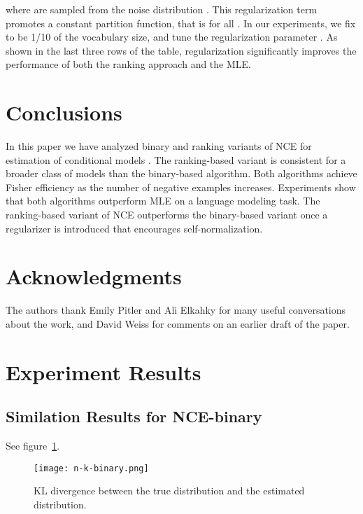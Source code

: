 \documentclass[11pt,a4paper]{article}
\begin{document}
where  are sampled from the noise distribution . This regularization term promotes a constant partition
function, that is  for all .
In our experiments, we fix  to be 1/10 of the vocabulary size,  and tune the regularization parameter .  As shown in the last three rows of the table,
regularization significantly improves the performance of both the ranking
approach and the MLE. 
 


\section{Conclusions}
In this paper we have analyzed binary and ranking variants of NCE for estimation of conditional models . The ranking-based variant is consistent for a broader class of models than the binary-based algorithm. Both algorithms achieve Fisher efficiency as the number of negative examples increases. 
Experiments show that both algorithms outperform MLE on a language modeling task.  
The ranking-based variant of NCE outperforms the binary-based variant once a regularizer is introduced that encourages self-normalization.



\section*{Acknowledgments}

The authors thank Emily Pitler and Ali Elkahky for many useful conversations about the work, 
and David Weiss for comments on an earlier draft of the paper.













 \clearpage{}\appendix
\section{Experiment Results}
\subsection{Similation Results for NCE-binary}
\label{sec:sim-binary}
See figure~\ref{fig:sim-binary}.
\begin{figure}[h]
\texttt{[image: n-k-binary.png]}
\caption{KL divergence between the true distribution and the estimated distribution.}
\label{fig:sim-binary}
\end{figure}
\end{document}

